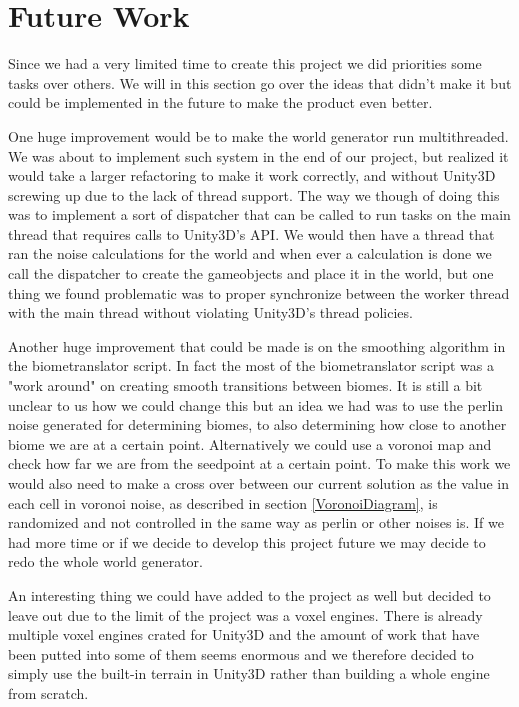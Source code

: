 \section{Future Work}
\label{cha:FutureWork}
Since we had a very limited time to create this project we did priorities some tasks over others. We will in this section go over the ideas that didn't make it but could be implemented in the future to make the product even better. 

One huge improvement would be to make the world generator run multithreaded. We was about to implement such system in the end of our project, but realized it would take a larger refactoring to make it work correctly, and without Unity3D screwing up due to the lack of thread support. The way we though of doing this was to implement a sort of dispatcher that can be called to run tasks on the main thread that requires calls to Unity3D's API. We would then have a thread that ran the noise calculations for the world and when ever a calculation is done we call the dispatcher to create the gameobjects and place it in the world, but one thing we found problematic was to proper synchronize between the worker thread with the main thread without violating Unity3D's thread policies.

Another huge improvement that could be made is on the smoothing algorithm in the biometranslator script. In fact the most of the biometranslator script was a "work around" on creating smooth transitions between biomes. It is still a bit unclear to us how we could change this but an idea we had was to use the perlin noise generated for determining biomes, to also determining how close to another biome we are at a certain point. Alternatively we could use a voronoi map and check how far we are from the seedpoint at a certain point. To make this work we would also need to make a cross over between our current solution as the value in each cell in voronoi noise, as described in section \ref{VoronoiDiagram}, is randomized and not controlled in the same way as perlin or other noises is. If we had more time or if we decide to develop this project future we may decide to redo the whole world generator.

An interesting thing we could have added to the project as well but decided to leave out due to the limit of the project was a voxel engines. There is already multiple voxel engines crated for Unity3D and the amount of work that have been putted into some of them seems enormous and we therefore decided to simply use the built-in terrain in Unity3D rather than building a whole engine from scratch.

